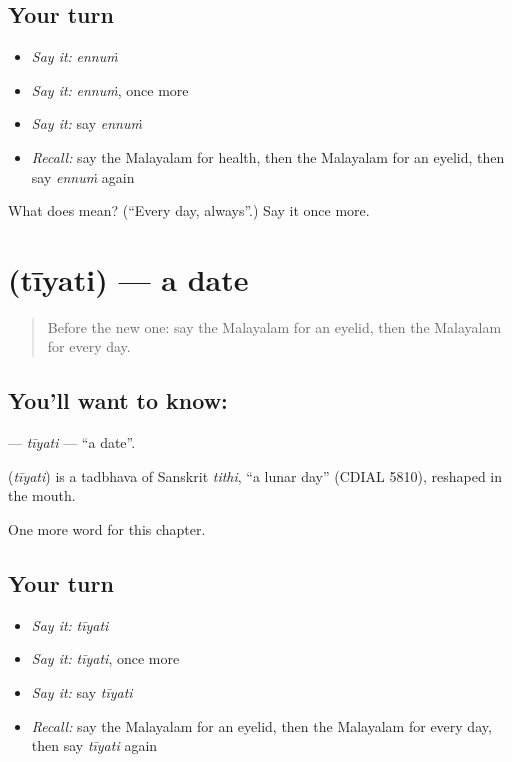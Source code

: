 \subsection*{Your turn}
\begin{itemize}
\raggedright
  \item \emph{Say it:} \emph{ennuṁ}
  \item \emph{Say it:} \emph{ennuṁ}, once more
  \item \emph{Say it:} say \emph{ennuṁ}
  \item \emph{Recall:} say the Malayalam for health, then the Malayalam for an eyelid, then say \emph{ennuṁ} again
\end{itemize}

\begin{tcolorbox}[breakable,colback=teal!4,colframe=teal!35!black,title={Before you move on}]
What does  mean? (\textquotedblleft{}Every day, always\textquotedblright{}.) Say it once more.
\end{tcolorbox}
\section[\texorpdfstring{\ml{തീയതി} (tīyati)}{തീയതി (tīyati)}]{ (tīyati) — a date}

\label{lesson:ML-C195-tiyati}



\begin{quote}
Before the new one: say the Malayalam for an eyelid, then the Malayalam for every day.
\end{quote}

\subsection*{You'll want to know: }
\textbf{} — \emph{tīyati} — \textquotedblleft{}a date\textquotedblright{}.

\begin{cousinweb}
\textbf{} (\emph{tīyati}) is a tadbhava of Sanskrit \emph{tithi}, \textquotedblleft{}a lunar day\textquotedblright{} (CDIAL 5810), reshaped in the mouth.
\end{cousinweb}

\begin{grammarlens}[title={What you've built}]
One more word for this chapter.
\end{grammarlens}

\subsection*{Your turn}
\begin{itemize}
\raggedright
  \item \emph{Say it:} \emph{tīyati}
  \item \emph{Say it:} \emph{tīyati}, once more
  \item \emph{Say it:} say \emph{tīyati}
  \item \emph{Recall:} say the Malayalam for an eyelid, then the Malayalam for every day, then say \emph{tīyati} again
\end{itemize}

